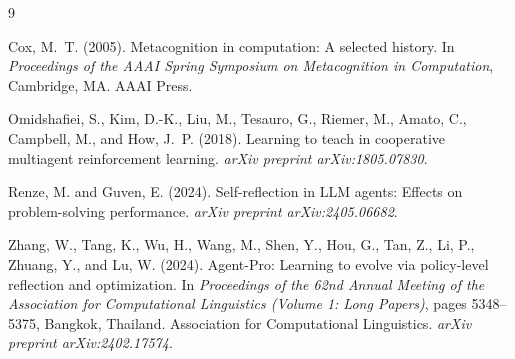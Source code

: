 \documentclass[11pt]{article}
\begin{document}
\begin{thebibliography}{9}

Cox, M.~T. (2005). Metacognition in computation: A selected history. In \emph{Proceedings of the AAAI Spring Symposium on Metacognition in Computation}, Cambridge, MA. AAAI Press.

Omidshafiei, S., Kim, D.-K., Liu, M., Tesauro, G., Riemer, M., Amato, C., Campbell, M., and How, J.~P. (2018). Learning to teach in cooperative multiagent reinforcement learning. \emph{arXiv preprint arXiv:1805.07830}.

Renze, M. and Guven, E. (2024). Self-reflection in LLM agents: Effects on problem-solving performance. \emph{arXiv preprint arXiv:2405.06682}.

Zhang, W., Tang, K., Wu, H., Wang, M., Shen, Y., Hou, G., Tan, Z., Li, P., Zhuang, Y., and Lu, W. (2024). Agent-Pro: Learning to evolve via policy-level reflection and optimization. In \emph{Proceedings of the 62nd Annual Meeting of the Association for Computational Linguistics (Volume 1: Long Papers)}, pages 5348--5375, Bangkok, Thailand. Association for Computational Linguistics. \emph{arXiv preprint arXiv:2402.17574}.

\end{thebibliography}
\end{document}
